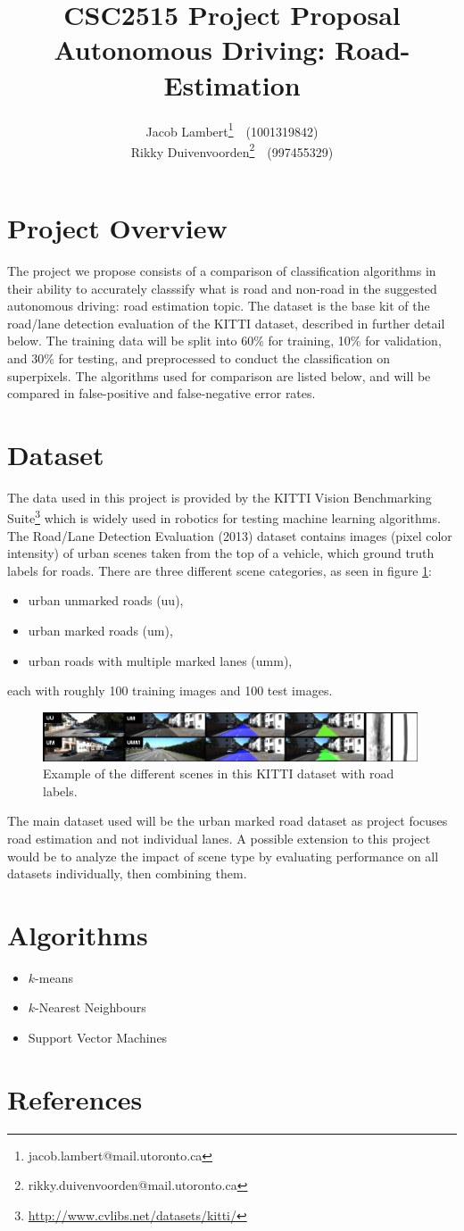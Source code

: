 \documentclass[a4paper,10pt]{article}
\title{\textbf{CSC2515 Project Proposal} \\
Autonomous Driving: Road-Estimation}
\author{
  Jacob Lambert\footnote{jacob.lambert@mail.utoronto.ca}~~(1001319842)\\
  Rikky Duivenvoorden\footnote{rikky.duivenvoorden@mail.utoronto.ca}~~(997455329) \\
}
\date{}
\begin{document}
\maketitle

\section{Project Overview}
The project we propose consists of a comparison of classification algorithms in their ability to accurately classsify what is road and non-road in the suggested autonomous driving: road estimation topic. The dataset is the base kit of the road/lane detection evaluation of the KITTI dataset, described in further detail below. The training data will be split into 60\% for training, 10\% for validation, and 30\% for testing, and preprocessed to conduct the classification on superpixels. The algorithms used for comparison are listed below, and will be compared in false-positive and false-negative error rates.


\section{Dataset}
The data used in this project is provided by the KITTI Vision Benchmarking Suite\footnote{ \url{http://www.cvlibs.net/datasets/kitti/}} which is widely used in robotics for testing machine learning algorithms. The Road/Lane Detection Evaluation (2013) dataset contains images (pixel color intensity) of urban scenes taken from the top of a vehicle, which ground truth labels for roads. There are three different scene categories, as seen in figure \ref{fig:kitti}:
\begin{itemize}
 \item urban unmarked roads (uu),
 \item urban marked roads (um),
 \item urban roads with multiple marked lanes (umm),
\end{itemize}
each with roughly 100 training images and 100 test images.
\begin{figure}[ht!]
 \centering
 \includegraphics[width=0.99\textwidth]{figs/kitti.jpg}
 \caption{Example of the different scenes in this KITTI dataset with road labels.}\label{fig:kitti}
\end{figure}
The main dataset used will be the urban marked road dataset as project focuses road estimation and not individual lanes. A possible extension to this project would be to analyze the impact of scene type by evaluating performance on all datasets individually, then combining them.

\section{Algorithms}
\begin{itemize}
 \item $k$-means
 \item $k$-Nearest Neighbours
 \item Support Vector Machines
\end{itemize}

\section{References}
\end{document}
